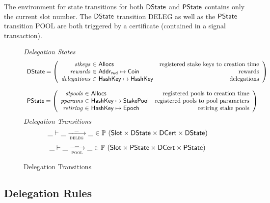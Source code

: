 The environment for state transitions for both $\mathsf{DState}$ and $\mathsf{PState}$ contains
only the current slot number. The $\mathsf{DState}$ transition DELEG as well as
the $\mathsf{PState}$ transition POOL are both triggered by a
certificate (contained in a signal transaction).


\begin{figure}
  \emph{Delegation States}
  \begin{equation*}
    \begin{array}{l}
    \DState =
    \left(\begin{array}{r@{~\in~}lr}
      \var{stkeys} & \Allocs & \text{registered stake keys to creation time}\\
      \var{rewards} & \AddrRWD \mapsto \Coin & \text{rewards}\\
      \var{delegations} & \HashKey \mapsto \HashKey & \text{delegations}\\
    \end{array}\right)
    \\
    \\
    \PState =
    \left(\begin{array}{r@{~\in~}lr}
      \var{stpools} & \Allocs & \text{registered pools to creation time}\\
      \var{pparams} & \HashKey \mapsto \StakePool
        & \text{registered pools to pool parameters}\\
      \var{retiring} & \HashKey \mapsto \Epoch & \text{retiring stake pools}\\
    \end{array}\right)
    \end{array}
  \end{equation*}
  \emph{Delegation Transitions}
  \begin{equation*}
    \_ \vdash \_ \trans{deleg}{\_} \_ \in
      \powerset (\Slot \times \DState \times \DCert \times \DState)
  \end{equation*}
  \begin{equation*}
    \_ \vdash \_ \trans{pool}{\_} \_ \in
      \powerset (\Slot \times \PState \times \DCert \times \PState)
  \end{equation*}
  \caption{Delegation Transitions}
  \label{fig:delegation-transitions}
\end{figure}


\subsection{Delegation Rules}
\label{sec:deleg-rules}


